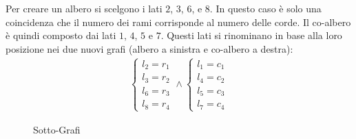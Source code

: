 \documentclass{article}
\numberwithin{equation}{subsection}
\begin{document}
Per creare un albero si scelgono i lati $2$, $3$, $6$, e $8$. In questo caso è solo una coincidenza che il numero dei rami corrisponde al numero delle corde. Il co-albero 
è quindi composto dai lati $1$, $4$, $5$ e $7$. Questi lati si rinominano in base alla loro posizione nei due nuovi grafi (albero a sinistra e co-albero a destra):
\begin{gather*}
    \begin{cases}
        l_2=r_1\\
        l_3=r_2\\
        l_6=r_3\\
        l_8=r_4
    \end{cases}\land
    \begin{cases}
        l_1=c_1\\
        l_4=c_2\\
        l_5=c_3\\
        l_7=c_4
    \end{cases}
\end{gather*}
\begin{figure}[H]%
    \centering
    \qquad
    \caption{Sotto-Grafi}
    \label{fig:albero-co-albero}
\end{figure}
\end{document}
